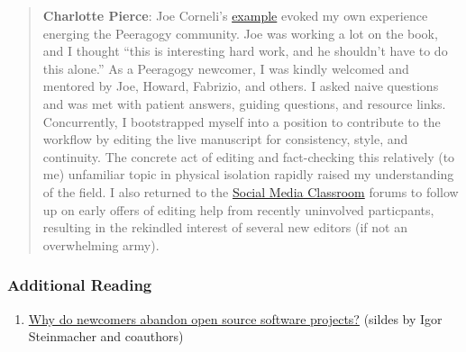 \begin{quote}
\textbf{Charlotte Pierce}: Joe Corneli's
\href{http://peeragogy.org/practice/heuristics/heartbeat/}{example}
evoked my own experience energing the Peeragogy community. Joe was
working a lot on the book, and I thought ``this is interesting hard
work, and he shouldn't have to do this alone.'' As a Peeragogy newcomer,
I was kindly welcomed and mentored by Joe, Howard, Fabrizio, and others.
I asked naive questions and was met with patient answers, guiding
questions, and resource links. Concurrently, I bootstrapped myself into
a position to contribute to the workflow by editing the live manuscript
for consistency, style, and continuity. The concrete act of editing and
fact-checking this relatively (to me) unfamiliar topic in physical
isolation rapidly raised my understanding of the field. I also returned
to the \href{http://socialmediaclassroom.com/host/peeragogy}{Social
Media Classroom} forums to follow up on early offers of editing help
from recently uninvolved particpants, resulting in the rekindled
interest of several new editors (if not an overwhelming army).
\end{quote}

\subsubsection{Additional Reading}

\begin{enumerate}
\item
  \href{http://lapessc.ime.usp.br/public/papers/13872/CHASE13\_present.pdf}{Why
  do newcomers abandon open source software projects?} (sildes by Igor
  Steinmacher and coauthors)
\end{enumerate}
